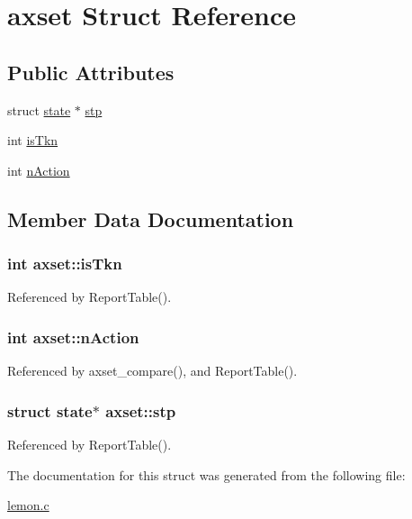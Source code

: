 \hypertarget{structaxset}{\section{axset Struct Reference}
\label{structaxset}
}
\subsection*{Public Attributes}
\begin{DoxyCompactItemize}
\item 
struct \hyperlink{structstate}{state} $\ast$ \hyperlink{structaxset_aa1eb7e365fefc2c7b34887334f5fb714}{stp}
\item 
int \hyperlink{structaxset_a33c39174f3938bc758e668d14cc7c7a6}{is\-Tkn}
\item 
int \hyperlink{structaxset_acc7e7a87721017f961105baf3f1f62cc}{n\-Action}
\end{DoxyCompactItemize}


\subsection{Member Data Documentation}
\hypertarget{structaxset_a33c39174f3938bc758e668d14cc7c7a6}{
\subsubsection[{is\-Tkn}]{\setlength{\rightskip}{0pt plus 5cm}int axset\-::is\-Tkn}}\label{structaxset_a33c39174f3938bc758e668d14cc7c7a6}


Referenced by Report\-Table().

\hypertarget{structaxset_acc7e7a87721017f961105baf3f1f62cc}{
\subsubsection[{n\-Action}]{\setlength{\rightskip}{0pt plus 5cm}int axset\-::n\-Action}}\label{structaxset_acc7e7a87721017f961105baf3f1f62cc}


Referenced by axset\-\_\-compare(), and Report\-Table().

\hypertarget{structaxset_aa1eb7e365fefc2c7b34887334f5fb714}{
\subsubsection[{stp}]{\setlength{\rightskip}{0pt plus 5cm}struct {\bf state}$\ast$ axset\-::stp}}\label{structaxset_aa1eb7e365fefc2c7b34887334f5fb714}


Referenced by Report\-Table().



The documentation for this struct was generated from the following file\-:\begin{DoxyCompactItemize}
\item 
\hyperlink{lemon_8c}{lemon.\-c}\end{DoxyCompactItemize}
